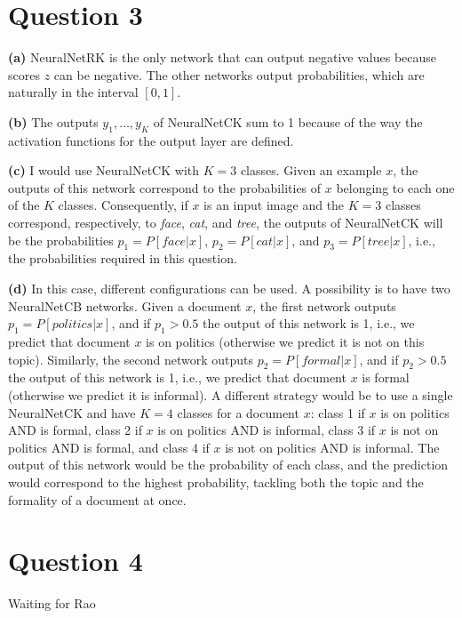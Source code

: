 \documentclass[leqno]{article}
\begin{document}
\hfill
\section*{Question 3} \textbf{(a)} NeuralNetRK is the only network that can output negative values because scores $z$ can be negative. The other 
networks output probabilities, which are naturally in the interval $[0,1]$.

\hfill

\noindent \textbf{(b)} The outputs $y_1, \ldots, y_K$ of NeuralNetCK sum to 1 because of the way the activation functions for the output layer are defined. 

\hfill

\noindent \textbf{(c)} I would use NeuralNetCK with $K = 3$ classes. Given an example $x$, the outputs of this network correspond to the probabilities of $x$ belonging to 
 each one of the $K$ classes. Consequently, if $x$ is an input image and the $K = 3$ classes correspond, respectively, to \textit{face}, \textit{cat}, and \textit{tree}, the 
outputs of NeuralNetCK will be the probabilities $p_1 = P[face|x]$, $p_2 = P[cat|x]$, and $p_3 = P[tree|x]$, i.e., the probabilities required in this question. 

\hfill

\noindent \textbf{(d)} In this case, different configurations can be used. A possibility is to have two NeuralNetCB networks. Given a document $x$, the first 
network outputs $p_1 = P[politics|x]$, and if $p_1 > 0.5$ the output of this network is 1, i.e., we predict that document $x$ is on politics (otherwise we predict it is not 
on this topic). Similarly, the 
second network outputs $p_2 = P[formal|x]$, and if $p_2 > 0.5$ the output of this network is 1, i.e., we predict that document $x$ is formal (otherwise we predict it is 
informal). A different strategy would be to use a single NeuralNetCK and have $K = 4$ classes for a document $x$: class 1 if $x$ is on politics AND is formal, 
class 2 if $x$ is on politics AND is informal, class 3 if $x$ is not on politics AND is formal, and class 4 if $x$ is not on politics AND is informal. The output of this 
network would be the probability of each class, and the prediction would correspond to the highest probability, tackling both the topic and the formality of a document at 
once. 

\hfill

\section*{Question 4} Waiting for Rao
\end{document}
